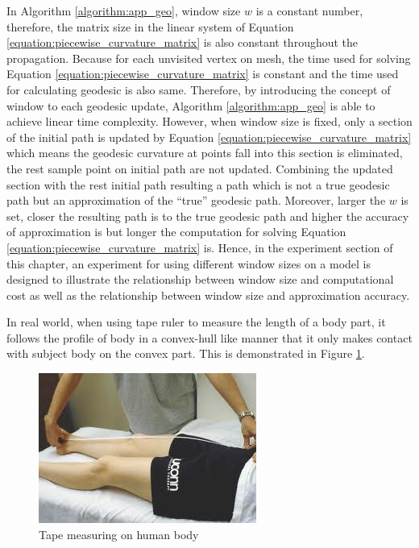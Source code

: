 In Algorithm \ref{algorithm:app_geo}, window size $w$ is a constant number, therefore, the matrix size in the linear system of Equation \ref{equation:piecewise_curvature_matrix} is also constant throughout the propagation. Because for each unvisited vertex on mesh, the time used for solving Equation \ref{equation:piecewise_curvature_matrix} is constant and the time used for calculating geodesic is also same. Therefore, by introducing the concept of window to each geodesic update, Algorithm \ref{algorithm:app_geo} is able to achieve linear time complexity. However, when window size is fixed, only a section of the initial path is updated by Equation \ref{equation:piecewise_curvature_matrix} which means the geodesic curvature at points fall into this section is eliminated, the rest sample point on initial path are not updated. Combining the updated section with the rest initial path resulting a path which is not a true geodesic path but an approximation of the ``true'' geodesic path. Moreover, larger the $w$ is set, closer the resulting path is to the true geodesic path and higher the accuracy of approximation is but longer the computation for solving Equation \ref{equation:piecewise_curvature_matrix} is. Hence, in the experiment section of this chapter, an experiment for using different window sizes on a model is designed to illustrate the relationship between window size and computational cost as well as the relationship between window size and approximation accuracy. 

In real world, when using tape ruler to measure the length of a body part, it follows the profile of body in a convex-hull like manner that it only makes contact with subject body on the convex part. This is demonstrated in Figure \ref{figure:tape_measuring}.

\begin{figure}[H]
	\centering
	\includegraphics[width=\textwidth]{../images/tape_measuring}
	\caption{Tape measuring on human body}
	\label{figure:tape_measuring}
\end{figure}

